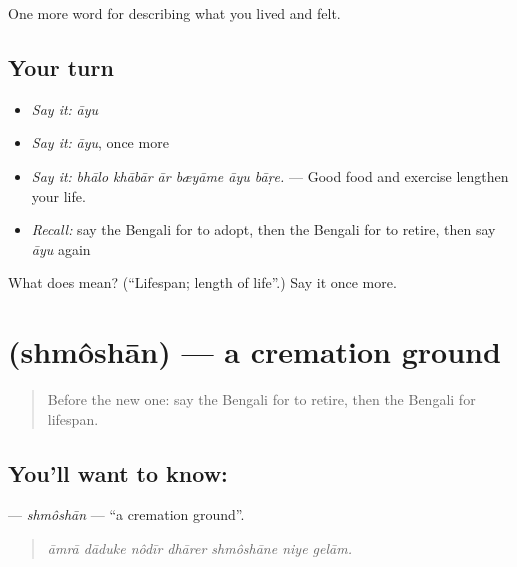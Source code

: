 \begin{grammarlens}[title={What you've built}]
One more word for describing what you lived and felt.
\end{grammarlens}

\subsection*{Your turn}
\begin{itemize}
\raggedright
  \item \emph{Say it:} \emph{āyu}
  \item \emph{Say it:} \emph{āyu}, once more
  \item \emph{Say it:} \emph{bhālo khābār ār bæyāme āyu bāṛe.} — Good food and exercise lengthen your life.
  \item \emph{Recall:} say the Bengali for to adopt, then the Bengali for to retire, then say \emph{āyu} again
\end{itemize}

\begin{tcolorbox}[breakable,colback=teal!4,colframe=teal!35!black,title={Before you move on}]
What does  mean? (\textquotedblleft{}Lifespan; length of life\textquotedblright{}.) Say it once more.
\end{tcolorbox}
\section[\texorpdfstring{\bn{শ্মশান} (shmôshān)}{শ্মশান (shmôshān)}]{ (shmôshān) — a cremation ground}

\label{lesson:BN-C491-shmoshan}



\begin{quote}
Before the new one: say the Bengali for to retire, then the Bengali for lifespan.
\end{quote}

\subsection*{You'll want to know: }
\textbf{} — \emph{shmôshān} — \textquotedblleft{}a cremation ground\textquotedblright{}.

\begin{quote}
      
\end{quote}

\begin{quote}
\emph{āmrā dāduke nôdīr dhārer shmôshāne niye gelām.}
\end{quote}

